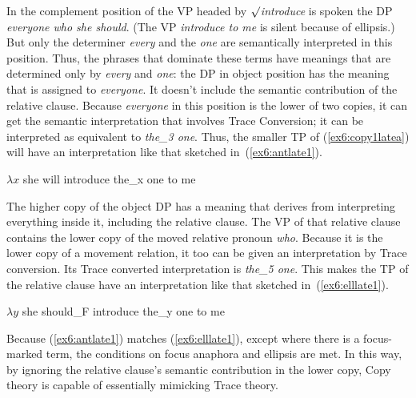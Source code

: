 In the complement position of the VP headed by \emph{$\surd$introduce} is spoken the DP \emph{everyone who she should}. (The VP \emph{introduce to me} is silent because of ellipsis.) But only the determiner \emph{every} and the  \emph{one} are semantically interpreted in this position. Thus, the phrases that dominate these terms have meanings that are determined only by \emph{every} and \emph{one}: the DP in object position has the meaning that is assigned to \emph{everyone}. It doesn't include the semantic contribution of the relative clause. Because \emph{everyone} in this position is the lower of two copies, it can get the semantic interpretation that involves Trace Conversion; it can be interpreted as equivalent to \emph{the_3 one}. Thus, the smaller TP of (\ref{ex6:copy1latea}) will have an interpretation like that sketched in~(\ref{ex6:antlate1}).
\begin{exe}
\raggedright
	\ex \label{ex6:antlate1}
	$\lambda x$ she will introduce the_x one to me 
\end{exe}

The higher copy of the object DP has a meaning that derives from interpreting everything inside it, including the relative clause. The VP of that relative clause contains the lower copy of the moved relative pronoun \emph{who}. Because it is the lower copy of a movement relation, it too can be given an interpretation by Trace conversion. Its Trace converted interpretation is \emph{the_5 one}. This makes the TP of the relative clause have an interpretation like that sketched in~(\ref{ex6:elllate1}).
\begin{exe}
\raggedright
	\ex \label{ex6:elllate1}
	$\lambda y$ she should_F introduce the_y one to me
\end{exe}
Because (\ref{ex6:antlate1}) matches (\ref{ex6:elllate1}), except where there is a focus-marked term, the conditions on focus anaphora and ellipsis are met. In this way, by ignoring the relative clause's semantic contribution in the lower copy, Copy theory is capable of essentially mimicking Trace theory.

